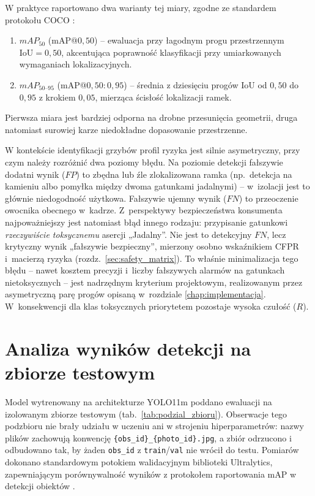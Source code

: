 W praktyce raportowano dwa warianty tej miary, zgodne ze standardem protokołu COCO \cite{lin2014coco}:
\begin{enumerate}
 \item $mAP_{50}$ (mAP@$0{,}50$) -- ewaluacja przy łagodnym progu przestrzennym $\mathrm{IoU}=0{,}50$, akcentująca poprawność klasyfikacji przy umiarkowanych wymaganiach lokalizacyjnych.
 \item $mAP_{50\text{--}95}$ (mAP@$0{,}50{:}0{,}95$) -- średnia z dziesięciu progów IoU od $0{,}50$ do $0{,}95$ z krokiem $0{,}05$, mierząca ścisłość lokalizacji ramek.
\end{enumerate}
Pierwsza miara jest bardziej odporna na drobne przesunięcia geometrii, druga natomiast surowiej karze niedokładne dopasowanie przestrzenne.

W kontekście identyfikacji grzybów profil ryzyka jest silnie asymetryczny, przy czym należy rozróżnić dwa poziomy błędu. Na poziomie detekcji fałszywie dodatni wynik ($FP$) to zbędna lub źle zlokalizowana ramka (np.\ detekcja na kamieniu albo pomyłka między dwoma gatunkami jadalnymi) -- w~izolacji jest to głównie niedogodność użytkowa. Fałszywie ujemny wynik ($FN$) to przeoczenie owocnika obecnego w~kadrze. Z~perspektywy bezpieczeństwa konsumenta najpoważniejszy jest natomiast błąd innego rodzaju: przypisanie gatunkowi \emph{rzeczywiście toksycznemu} asercji „Jadalny”. Nie jest to detekcyjny $FN$, lecz krytyczny wynik „fałszywie bezpieczny”, mierzony osobno wskaźnikiem CFPR i~macierzą ryzyka (rozdz.~\ref{sec:safety_matrix}). To właśnie minimalizacja tego błędu -- nawet kosztem precyzji i~liczby fałszywych alarmów na gatunkach nietoksycznych -- jest nadrzędnym kryterium projektowym, realizowanym przez asymetryczną parę progów opisaną w~rozdziale \ref{chap:implementacja}. W~konsekwencji dla klas toksycznych priorytetem pozostaje wysoka czułość ($R$).

\section{Analiza wyników detekcji na zbiorze testowym}
Model wytrenowany na architekturze YOLO11m poddano ewaluacji na izolowanym zbiorze testowym (tab.~\ref{tab:podzial_zbioru}). Obserwacje tego podzbioru nie brały udziału w uczeniu ani w strojeniu hiperparametrów: nazwy plików zachowują konwencję \texttt{\{obs\_id\}\_\{photo\_id\}.jpg}, a zbiór odrzucono i odbudowano tak, by żaden \texttt{obs\_id} z \texttt{train}/\texttt{val} nie wrócił do testu. Pomiarów dokonano standardowym potokiem walidacyjnym biblioteki Ultralytics, zapewniającym porównywalność wyników z protokołem raportowania mAP w detekcji obiektów \cite{ultralytics2024yolo11, lin2014coco}.

